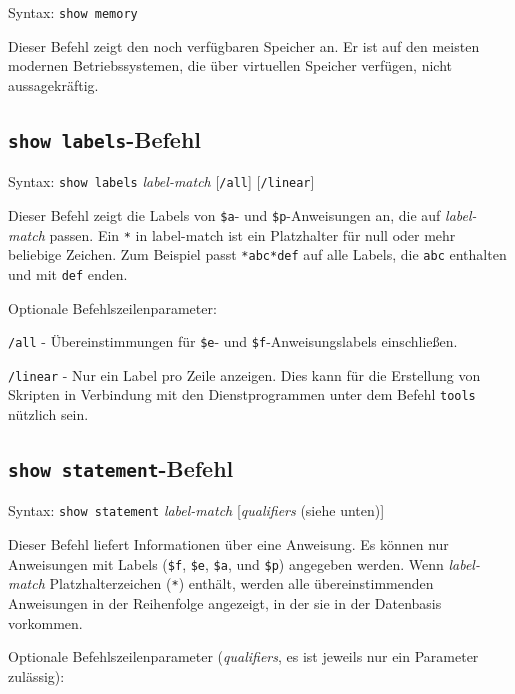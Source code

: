 Syntax:  \texttt{show memory}

Dieser Befehl zeigt den noch verfügbaren Speicher an.  Er ist auf den meisten modernen Betriebssystemen, die über virtuellen Speicher verfügen, nicht aussagekräftig. 

\subsection{\texttt{show labels}-Befehl}

Syntax:  \texttt{show labels} {\em label-match} [\texttt{/all}]
   [\texttt{/linear}]

Dieser Befehl zeigt die Labels von \texttt{\$a}- und \texttt{\$p}-Anweisungen an, die auf {\em label-match} passen.  Ein \verb$*$ in {label-match} ist ein Platzhalter für null oder mehr beliebige Zeichen.  Zum Beispiel passt \verb$*abc*def$ auf alle Labels, die \verb$abc$ enthalten und mit \verb$def$ enden. 

Optionale Befehlszeilenparameter:

   \texttt{/all} - 
    Übereinstimmungen für \texttt{\$e}- und \texttt{\$f}-Anweisungslabels einschließen.

   \texttt{/linear} - 
    Nur ein Label pro Zeile anzeigen.  Dies kann für die Erstellung von Skripten in Verbindung mit den Dienstprogrammen unter dem Befehl \texttt{tools} nützlich sein. 


\subsection{\texttt{show statement}-Befehl}

Syntax:  \texttt{show statement} {\em label-match} [{\em qualifiers} (siehe unten)]

Dieser Befehl liefert Informationen über eine Anweisung.  Es können nur Anweisungen mit Labels (\texttt{\$f}, 
\texttt{\$e}, 
\texttt{\$a}, und 
\texttt{\$p}) angegeben werden. 
Wenn {\em label-match} Platzhalterzeichen (\verb$*$) enthält, werden alle übereinstimmenden Anweisungen in der Reihenfolge angezeigt, in der sie in der Datenbasis vorkommen. 

Optionale Befehlszeilenparameter ({\em qualifiers}, es ist jeweils nur ein Parameter zulässig):

